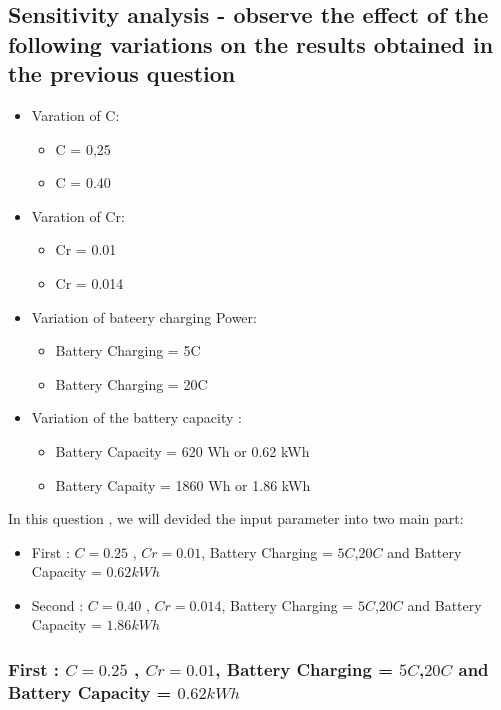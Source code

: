 \documentclass[12pt,a4paper]{article}
\numberwithin{equation}{section}
\begin{document}
\subsection{Sensitivity analysis - observe the effect of the following variations on the results obtained in the previous question}
\begin{itemize}
	\item Varation of C:
	\begin{itemize}
		\item C = 0,25
		\item C = 0.40
	\end{itemize}

	\item Varation of Cr:
	\begin{itemize}
		\item Cr = 0.01
		\item Cr = 0.014
	\end{itemize}

	\item Variation of bateery charging Power:
	\begin{itemize}
		\item Battery Charging = 5C
		\item Battery Charging = 20C
	\end{itemize}

	\item Variation of the battery capacity :
	
	\begin{itemize}
		\item Battery Capacity  = 620 Wh or 0.62 kWh
		\item Battery Capaity = 1860 Wh or 1.86 kWh
	\end{itemize}
\end{itemize}


In this question , we will devided the input parameter into two main part: 

\begin{itemize}
	\item First : $C = 0.25$ , $Cr = 0.01$, Battery Charging = $5C$,$20C$ and Battery Capacity = $0.62 kWh$
	\item Second : $C = 0.40$ , $Cr = 0.014$, Battery Charging = $5C$,$20C$ and Battery Capacity = $1.86 kWh$
\end{itemize}


\subsubsection{First : $C = 0.25$ , $Cr = 0.01$, Battery Charging = $5C$,$20C$ and Battery Capacity = $0.62 kWh$}
\end{document}
